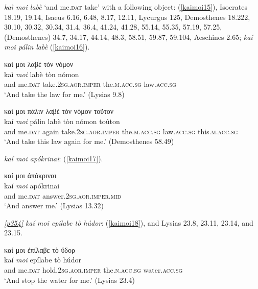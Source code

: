 \textit{kaì moi labè} `and me.\textsc{dat} take' with a following object: (\ref{kaimoi15}), Isocrates 18.19, 19.14, Isaeus 6.16, 6.48, 8.17, 12.11, Lycurgus 125, Demosthenes 18.222, 30.10, 30.32, 30.34, 31.4, 36.4, 41.24, 41.28, 55.14, 55.35, 57.19, 57.25, (Demosthenes) 34.7, 34.17, 44.14, 48.3, 58.51, 59.87, 59.104, Aeschines 2.65; \textit{kaí moi pálin labè} (\ref{kaimoi16}).

\begin{exe}
\ex καὶ μοι λαβὲ τὸν νόμον\\
\gll kaì \emph{moi} labè tòn nómon\\
and me.\textsc{dat} take.\textsc{2sg.aor.imper} the.\textsc{m.acc.sg} law.\textsc{acc.sg}\\
\trans `And take the law for me.' (Lysias 9.8)
\label{kaimoi15}
\end{exe}

\begin{exe}
\ex καί μοι πάλιν λαβὲ τὸν νόμον τοῦτον\\
\gll kaí \emph{moi} pálin labè tòn nómon toûton\\
and me.\textsc{dat} again take.\textsc{2sg.aor.imper}
the\textsc{.m.acc.sg} law\textsc{.acc.sg} this.\textsc{m.acc.sg}\\
\trans `And take this law again for me.' (Demosthenes 58.49)
\label{kaimoi16}
\end{exe}

\textit{kaí moi apókrinai}: (\ref{kaimoi17}).

\begin{exe}
\ex καί μοι ἀπόκριναι\\
\gll kaí \emph{moi} apókrinai\\
and me.\textsc{dat} answer.\textsc{2sg.aor.imper.mid}\\
\trans `And answer me.' (Lysias 13.32)
\label{kaimoi17}
\end{exe}

\hyperlink{p354}{\emph{[p354]}} \textit{kaí moi epílabe tò húdor}: (\ref{kaimoi18}), and Lysias 23.8, 23.11, 23.14, and 23.15.

\begin{exe}
\ex καί μοι ἐπίλαβε τὸ ὕδορ\\
\gll kaí \emph{moi} epílabe tò húdor\\
and me.\textsc{dat} hold.\textsc{2sg.aor.imper} the.\textsc{n.acc.sg} water.\textsc{acc.sg}\\
\trans `And stop the water for me.' (Lysias 23.4)\\
\label{kaimoi18}
\end{exe}

